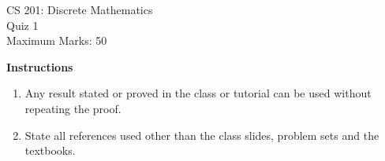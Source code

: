 \documentclass[a4paper]{article}
\theoremstyle{definition}
\begin{document}
\begin{center}
    {\Large CS 201: Discrete Mathematics}\\
    {\Large Quiz 1}\\
    {Maximum Marks: 50}
\end{center}
\vspace*{4mm}

\textbf{Instructions}
\begin{enumerate}
    \itemsep0em
    \item Any result stated or proved in the class or tutorial can be used without repeating the proof.
    \item State all references used other than the class slides, problem sets and the textbooks.
\end{enumerate}
\vspace{2em}
\end{document}

